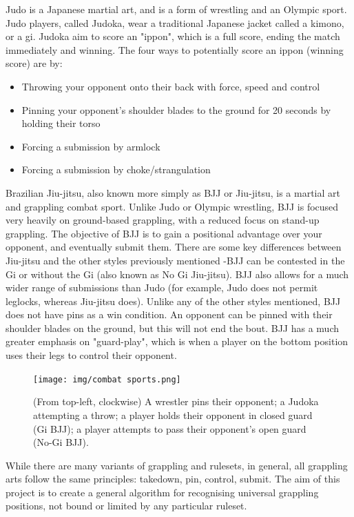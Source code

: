 \documentclass[a4paper, oneside, 11pt]{article}
\begin{document}
Judo is a Japanese martial art, and is a form of wrestling and an Olympic sport. Judo players, called Judoka, wear a traditional Japanese jacket called a kimono, or a gi. Judoka aim to score an "ippon", which is a full score, ending the match immediately and winning. The four ways to potentially score an ippon (winning score) are by:
\begin{itemize}
    \item Throwing your opponent onto their back with force, speed and control
    \item Pinning your opponent's shoulder blades to the ground for 20 seconds by holding their torso
    \item Forcing a submission by armlock
    \item Forcing a submission by choke/strangulation
\end{itemize}

Brazilian Jiu-jitsu, also known more simply as BJJ or Jiu-jitsu, is a martial art and grappling combat sport. Unlike Judo or Olympic wrestling, BJJ is focused very heavily on ground-based grappling, with a reduced focus on stand-up grappling. The objective of BJJ is to gain a positional advantage over your opponent, and eventually submit them. There are some key differences between Jiu-jitsu and the other styles previously mentioned -BJJ can be contested in the Gi or without the Gi (also known as No Gi Jiu-jitsu). BJJ also allows for a much wider range of submissions than Judo (for example, Judo does not permit leglocks, whereas Jiu-jitsu does). Unlike any of the other styles mentioned, BJJ does not have pins as a win condition. An opponent can be pinned with their shoulder blades on the ground, but this will not end the bout. BJJ has a much greater emphasis on "guard-play", which is when a player on the bottom position uses their legs to control their opponent.

\begin{figure}[ht]
    \centering
    \texttt{[image: img/combat sports.png]}
    \caption{(From top-left, clockwise) A wrestler pins their opponent; a Judoka attempting a throw; a player holds their opponent in closed guard (Gi BJJ); a player attempts to pass their opponent's open guard (No-Gi BJJ).}
    \label{fig:bjjguard}
\end{figure}

While there are many variants of grappling and rulesets, in general, all grappling arts follow the same principles: takedown, pin, control, submit. The aim of this project is to create a general algorithm for recognising universal grappling positions, not bound or limited by any particular ruleset. 
\end{document}
